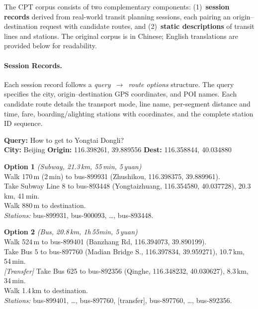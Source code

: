 \documentclass{article}
\newcommand{\dashrule}{\noindent\makebox[\linewidth]{\color{black!40}\dashrulefill}}\newcommand{\dashrulefill}{\leaders\hbox to 5pt{\hss\rule{3pt}{0.4pt}\hss}\hfill}
\begin{document}
The CPT corpus consists of two complementary components: (1)~\textbf{session records} derived from real-world transit planning sessions, each pairing an origin--destination request with candidate routes, and (2)~\textbf{static descriptions} of transit lines and stations. The original corpus is in Chinese; English translations are provided below for readability.

\paragraph{Session Records.}
Each session record follows a \textit{query~$\rightarrow$~route options} structure. The query specifies the city, origin--destination GPS coordinates, and POI names. Each candidate route details the transport mode, line name, per-segment distance and time, fare, boarding/alighting stations with coordinates, and the complete station ID sequence.

\begin{tcolorbox}[colback=gray!3, colframe=black!40, boxrule=0.4pt, arc=2pt, left=6pt, right=6pt, top=4pt, bottom=4pt, fontupper=\small, fontlower=\small, breakable, title={\small\textbf{CPT Session Record}}]
\textbf{Query:} How to get to Yongtai Dongli? \\
\textbf{City:} Beijing \quad \textbf{Origin:} 116.398261, 39.889556 \quad \textbf{Dest:} 116.358844, 40.034880

\tcblower

\textbf{Option 1} \textit{(Subway, 21.3\,km, 55\,min, 5\,yuan)} \\[2pt]
Walk 170\,m (2\,min) to bus-899931 (Zhushikou, 116.398375, 39.889961). \\
Take Subway Line 8 to bus-893448 (Yongtaizhuang, 116.354580, 40.037728), 20.3\,km, 41\,min. \\
Walk 880\,m to destination. \\[2pt]
\textit{Stations:} bus-899931, bus-900093, \ldots, bus-893448.

\vspace{4pt}
\noindent\dashrule
\vspace{4pt}

\textbf{Option 2} \textit{(Bus, 20.8\,km, 1h\,55min, 5\,yuan)} \\[2pt]
Walk 524\,m to bus-899401 (Banzhang Rd, 116.394073, 39.890199). \\
Take Bus 5 to bus-897760 (Madian Bridge S., 116.397834, 39.959271), 10.7\,km, 54\,min. \\
\textit{[Transfer]} Take Bus 625 to bus-892356 (Qinghe, 116.348232, 40.030627), 8.3\,km, 34\,min. \\
Walk 1.4\,km to destination. \\[2pt]
\textit{Stations:} bus-899401, \ldots, bus-897760, [transfer], bus-897760, \ldots, bus-892356.
\end{tcolorbox}
\end{document}
